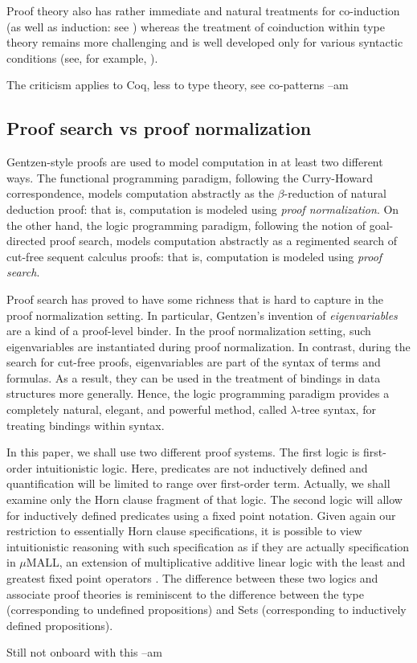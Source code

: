 Proof theory also has rather immediate and natural treatments for
co-induction (as well as induction: see
\cite{baelde12tocl,momigliano12jal}) whereas the treatment of
coinduction within type theory remains more challenging and is well
developed only for various syntactic conditions (see, for example,
\cite{bertot08entcs}).
\begin{metanote}
  The criticism applies to Coq, less to type theory, see co-patterns --am
\end{metanote}

\subsection{Proof search vs proof normalization}

Gentzen-style proofs are used to model computation in at least two
different ways.  The functional programming paradigm, following the
Curry-Howard correspondence, models computation abstractly as the
$\beta$-reduction of natural deduction proof: that is, computation is
modeled using \emph{proof normalization}.  On the other hand, the
logic programming paradigm, following the notion of goal-directed
proof search, models computation abstractly as a regimented search of
cut-free sequent calculus proofs: that is, computation is modeled
using \emph{proof search}.

Proof search has proved to have some richness that is hard to capture
in the proof normalization setting.  In particular, Gentzen's
invention of \emph{eigenvariables} are a kind of a proof-level
binder.  In the proof normalization setting, such eigenvariables
are instantiated during proof normalization.  In contrast, during the
search for cut-free proofs, eigenvariables are part of the syntax of
terms and formulas.  As a result, they can be used in the treatment of
bindings in data structures more generally.  Hence, the logic
programming paradigm provides a completely natural, elegant, and
powerful method, called $\lambda$-tree syntax, for treating bindings
within syntax.

In this paper, we shall use two different proof systems.  The first
logic is first-order intuitionistic logic.  Here, predicates
are not inductively defined and quantification will be limited to
range over first-order term.  Actually, we shall examine only the Horn
clause fragment of that logic.
%
The second logic will allow for inductively defined predicates using a
fixed point notation.   Given again our restriction to essentially
Horn clause specifications, it is possible to view intuitionistic
reasoning with such specification as if they are actually
specification in $\mu$MALL, an extension of multiplicative additive
linear logic with the least and greatest fixed point operators
\cite{baelde12tocl,baelde07lpar,heath19jar}.
%
The difference between these two logics and associate proof theories
is reminiscent to the difference between the type 
(corresponding to undefined propositions) and Sets (corresponding to
inductively defined propositions).
\begin{metanote}
  Still not onboard with this --am
\end{metanote}

